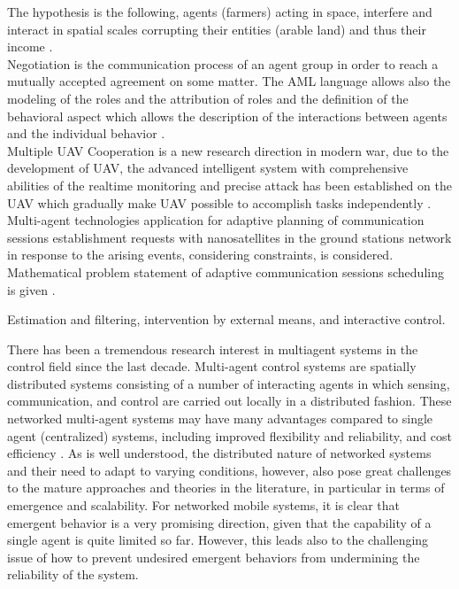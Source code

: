 \documentclass[letterpaper, 10 pt, conference]{ieeeconf}  %
\begin{document}
The hypothesis is the following, agents (farmers) acting in space, interfere and interact in spatial scales corrupting their entities (arable land) and thus their income \cite{Roth2009}.\\

Negotiation is the communication process of an agent group in order to reach a mutually accepted agreement on some matter. The AML language allows also the modeling of the roles and the attribution of roles and the definition of the behavioral aspect which allows the description of the interactions between agents and the individual behavior \cite{Belaqziz2011}.\\

Multiple UAV Cooperation is a new research direction in modern war, due to the development of UAV, the advanced intelligent system with comprehensive abilities of the realtime monitoring and precise attack has been established on the UAV which gradually make UAV possible to accomplish tasks independently \cite{Han2013}.\\

Multi-agent technologies application for adaptive planning of communication sessions establishment requests with nanosatellites in the ground stations network in response to the arising events, considering constraints, is considered. Mathematical problem statement of adaptive communication sessions scheduling is given \cite{Belokonov2015}.

Estimation and filtering, intervention by external means, and interactive control.

There has been a tremendous research interest in multiagent systems in the control field since the last decade. Multi-agent control systems are spatially distributed systems consisting of a number of interacting agents in which sensing, communication, and control are carried out locally in a distributed fashion. These networked multi-agent systems may have many advantages compared to single agent (centralized) systems, including improved flexibility and reliability, and cost efficiency \cite{jiang2013estimation}.
As is well understood, the distributed nature of networked systems and their need to adapt to varying conditions, however, also pose great challenges to the mature approaches and theories in the literature, in particular in terms of emergence and scalability. For networked mobile systems, it is clear that emergent behavior is a very promising direction, given that the capability of a single agent is quite limited so far. However, this leads also to the challenging issue of how to prevent undesired emergent behaviors from undermining the reliability of the system\cite{jiang2013estimation}.
\end{document}
